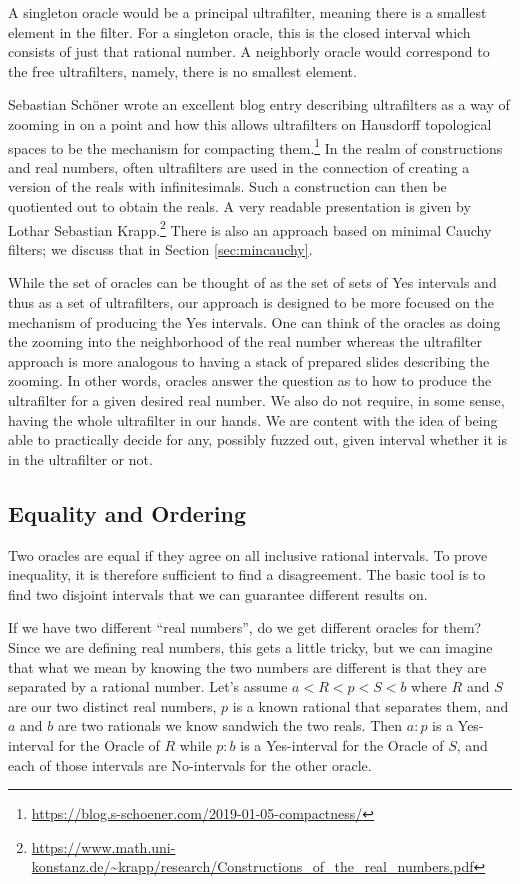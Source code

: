 \documentclass[12pt]{article}
\begin{document}
A singleton oracle would be a principal ultrafilter, meaning there is a smallest element in the filter. For a singleton oracle, this is the closed interval which consists of just that rational number. A neighborly oracle would correspond to the free ultrafilters, namely, there is no smallest element. 

Sebastian Schöner wrote an excellent blog entry describing ultrafilters as a way of zooming in on a point and how this allows ultrafilters on Hausdorff topological spaces to be the mechanism for compacting them.\footnote{\url{https://blog.s-schoener.com/2019-01-05-compactness/}} In the realm of constructions and real numbers, often ultrafilters are used in the connection of creating a version of the reals with infinitesimals. Such a construction can then be quotiented out to obtain the reals. A very readable presentation is given by Lothar Sebastian Krapp.\footnote{\url{https://www.math.uni-konstanz.de/~krapp/research/Constructions_of_the_real_numbers.pdf}} There is also an approach based on minimal Cauchy filters; we discuss that in Section \ref{sec:mincauchy}.

While the set of oracles can be thought of as the set of sets of Yes intervals and thus as a set of ultrafilters, our approach is designed to be more focused on the mechanism of producing the Yes intervals. One can think of the oracles as doing the zooming into the neighborhood of the real number whereas the ultrafilter approach is more analogous to having a stack of prepared slides describing the zooming. In other words, oracles answer the question as to how to produce the ultrafilter for a given desired real number. We also do not require, in some sense, having the whole ultrafilter in our hands. We are content with the idea of being able to practically decide for any, possibly fuzzed out, given interval whether it is in the ultrafilter or not.  

\subsection{Equality and Ordering}

Two oracles are equal if they agree on all inclusive rational intervals. To prove inequality, it is therefore sufficient to find a disagreement. The basic tool is to find two disjoint intervals that we can guarantee different results on. 

If we have two different ``real numbers'', do we get different oracles for them? Since we are defining real numbers, this gets a little tricky, but we can imagine that what we mean by knowing the two numbers are different is that they are separated by a rational number. Let's assume $a < R < p < S < b$ where $R$ and $S$ are our two distinct real numbers,  $p$ is a known rational that separates them, and $a$ and $b$ are two rationals we know sandwich the two reals. Then $a:p$ is a Yes-interval for the Oracle of $R$ while $p:b$ is a Yes-interval for the Oracle of $S$, and each of those intervals are No-intervals for the other oracle. 
\end{document}

